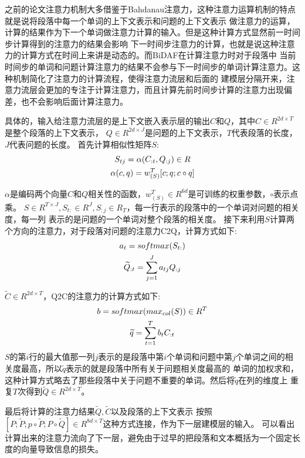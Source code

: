 之前的论文注意力机制大多借鉴于Bahdanau注意力，这种注意力运算机制的特点
就是说将段落中每一个单词的上下文表示和问题的上下文表示
做注意力的运算，计算的结果作为下一个单词做注意力计算的输入。但是这种计算方式显然前一时间步计算得到的注意力的结果会影响
下一时间步注意力的计算，也就是说这种注意力的计算方式在时间上来讲是动态的。而BiDAF在计算注意力时对于段落中
当前时间步的单词和问题计算注意力的结果不会参与下一时间步的单词计算注意力。这种机制简化了注意力的计算流程，使得注意力流层和后面的
建模层分隔开来，注意力流层会更加的专注于计算注意力，而且计算先前时间步计算的注意力出现偏差，也不会影响后面计算注意力。

具体的，输入给注意力流层的是上下文嵌入表示层的输出$C$和$Q$，其中$C\in R^{2d\times T}$是整个段落的上下文表示，
$Q\in R^{2d\times J}$是问题的上下文表示，$T$代表段落的长度，$J$代表问题的长度。
首先计算相似性矩阵$S$:
\begin{gather}
    S_{tj}=\alpha(C_{:t},Q_{:j}) \in R \notag \\ 
    \alpha(c,q)=w_{(S)}^T[c;q;c\circ q] \notag
\end{gather}

$\alpha$是编码两个向量$C$和$Q$相关性的函数，$w_{(S)}^T\in R^{6d}$是可训练的权重参数，$\circ$表示点乘。
$S\in R^{T\times J},S_{t:}\in R^{J},S_{:j}\in R_{T}$，每一行表示的段落中的一个单词对问题的相关度，每一列
表示的是问题的一个单词对整个段落的相关度。
接下来利用$S$计算两个方向的注意力，对于段落对问题的注意力C2Q，计算方式如下:
\begin{gather}
    a_t=softmax(S_{t:}) \notag\\
    \widetilde{Q}_{:t}=\sum_{j=1}^{J}a_{tj}Q_{:j}\notag
\end{gather}

$\widetilde{C}\in R^{2d\times T}$，Q2C的注意力的计算方式如下:
\begin{gather}
    b=softmax(max_{col}(S))\in R^T \notag \\
    \widetilde{q}=\sum_{t=1}^{T}b_tC_{:t} \notag 
\end{gather}
$S$的第$i$行的最大值那一列$j$表示的是段落中第$i$个单词和问题中第$j
$个单词之间的相关度最高，所以$\widetilde{q}$表示的就是段落中所有关于问题相关度最高的
单词的加权求和，这种计算方式略去了那些段落中关于问题不重要的单词。然后将$\widetilde{q}$在列的维度上
重复$T$次得到$\widetilde{Q}\in R^{2d\times T}$。

最后将计算的注意力结果$\widetilde{Q},\widetilde{C}$以及段落的上下文表示
按照$[P;\widetilde{P};p\circ\widetilde{P};P\circ\widetilde{Q}]\in R^{8d\times T}$这种方式连接，作为下一层建模层的输入。
可以看出计算出来的注意力流向了下一层，避免由于过早的把段落和文本概括为一个固定长度的向量导致信息的损失。


